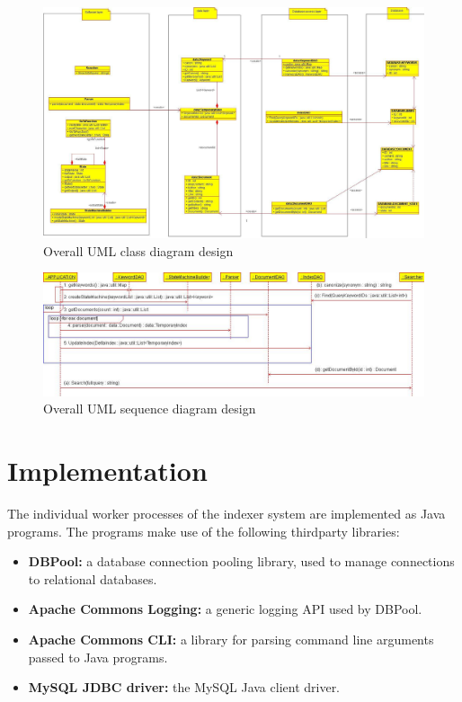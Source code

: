 \documentclass[10pt]{report}
\begin{document}
\begin{figure}
  \begin{center}
        \includegraphics[angle=90,width=\textwidth,height=!]{overallclassdiagram}
  \end{center}
  \caption{Overall UML class diagram design}
  \label{fig:overallclassdiagram}
\end{figure} 

\begin{figure}
  \begin{center}
        \includegraphics[width=\textwidth,height=!]{overallsequencediagram}
  \end{center}
  \caption{Overall UML sequence diagram design}
  \label{fig:overallsequencediagram}
\end{figure} 


\section{Implementation}
\label{sec:implementation}
The individual worker processes of the indexer system are implemented as Java
programs. The programs make use of the following thirdparty libraries:

\begin{itemize}
  \item \textbf{DBPool:} a database connection pooling library, used
    to manage connections to relational databases.
  \item \textbf{Apache Commons Logging:} a generic logging API used by
    DBPool.
  \item \textbf{Apache Commons CLI:} a library for parsing command
    line arguments passed to Java programs.
  \item \textbf{MySQL JDBC driver:} the MySQL Java client driver.
\end{itemize}
\end{document}

